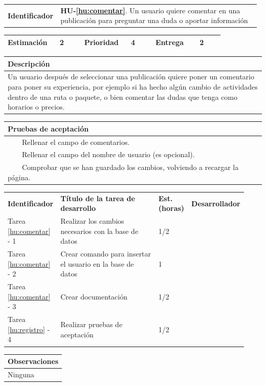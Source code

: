 \documentclass[11pt]{article}
\newcommand{\tabitem}{~~\llap{\textbullet}~~}
\begin{document}
\begin{longtable}{p{0.18\linewidth}|p{0.8\linewidth}}
  \rowcolor{LightCyan}
  \textbf{Identificador} & \textbf{HU-\ref{hu:comentar}}. Un usuario quiere comentar en una publicación para preguntar una duda o aportar información \\  
\end{longtable}
\vspace{-0.8cm}
\begin{longtable}{p{0.18\linewidth}|p{0.1\linewidth}|p{0.18\linewidth}|p{0.1\linewidth}|p{0.18\linewidth}|p{0.1\linewidth}}
	\toprule
	\textbf{Estimación} & 2 & \textbf{Prioridad} & 4 & \textbf{Entrega} & 2 \\
	\bottomrule
\end{longtable}
\vspace{-0.8cm}
\begin{longtable}{p{1.028\linewidth}}
	\textbf{Descripción}\\
	\midrule
	Un usuario después de seleccionar una publicación quiere poner un comentario para poner su experiencia, por ejemplo si ha hecho algún cambio de actividades dentro de una ruta o paquete, o bien comentar las dudas que tenga como horarios o precios. \\
	\bottomrule
\end{longtable}
\vspace{-0.8cm}
\begin{longtable}{p{1.028\linewidth}}
	\textbf{Pruebas de aceptación}\\
	\midrule
	\tabitem Rellenar el campo de comentarios.\\
	\tabitem Rellenar el campo del nombre de usuario (es opcional).\\
	\tabitem Comprobar que se han guardado los cambios, volviendo a recargar la página.\\
\end{longtable}
\vspace{-0.8cm}
\begin{longtable}{p{0.18\linewidth}|p{0.48\linewidth}|p{0.1\linewidth}|p{0.17\linewidth}}
  \toprule
  \textbf{Identificador} & \textbf{Título de la tarea de desarrollo} & \textbf{Est. (horas)} & \textbf{Desarrollador} \\
  Tarea \ref{hu:comentar} - 1 & Realizar los cambios necesarios con la base de datos & 1/2 &\\
  Tarea \ref{hu:comentar} - 2 & Crear comando para insertar el usuario en la base de datos & 1 & \\
  Tarea \ref{hu:comentar} - 3 & Crear documentación & 1/2 & \\
  Tarea \ref{hu:registro} - 4 & Realizar pruebas de aceptación & 1/2 &  \\
  \bottomrule
\end{longtable}
\vspace{-0.8cm}
\begin{longtable}{p{1.028\linewidth}}
  \textbf{Observaciones}\\
  \midrule
  Ninguna\\
  \bottomrule
\end{longtable}
\end{document}
